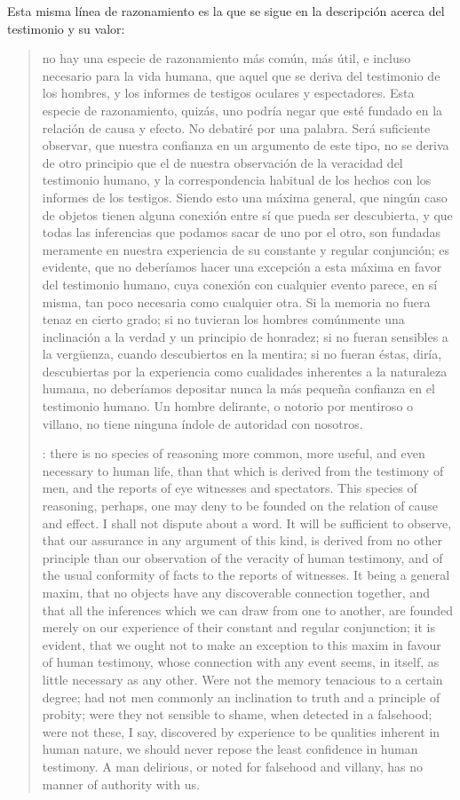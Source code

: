 Esta misma línea de razonamiento es la que se sigue en la descripción acerca del
testimonio y su valor:
\blockquote[{\cite[\S10,1. 74]{hume1777enquiry}}: there is no species of
reasoning more common, more useful, and even necessary to human life, than that
which is derived from the testimony of men, and the reports of eye witnesses and
spectators. This species of reasoning, perhaps, one may deny to be founded on
the relation of cause and effect. I shall not dispute about a word. It will be
sufficient to observe, that our assurance in any argument of this kind, is
derived from no other principle than our observation of the veracity of human
testimony, and of the usual conformity of facts to the reports of witnesses. It
being a general maxim, that no objects have any discoverable connection
together, and that all the inferences which we can draw from one to another, are
founded merely on our experience of their constant and regular conjunction; it
is evident, that we ought not to make an exception to this maxim in favour of
human testimony, whose connection with any event seems, in itself, as little
necessary as any other. Were not the memory tenacious to a certain degree; had
not men commonly an inclination to truth and a principle of probity; were they
not sensible to shame, when detected in a falsehood; were not these, I say,
discovered by experience to be qualities inherent in human nature, we should
never repose the least confidence in human testimony. A man delirious, or noted
for falsehood and villany, has no manner of authority with us.]{no hay una
  especie de razonamiento más común, más útil, e incluso necesario para la vida
  humana, que aquel que se deriva del testimonio de los hombres, y los informes
  de testigos oculares y espectadores. Esta especie de razonamiento, quizás, uno
  podría negar que esté fundado en la relación de causa y efecto. No debatiré
  por una palabra. Será suficiente observar, que nuestra confianza en un
  argumento de este tipo, no se deriva de otro principio que el de nuestra
  observación de la veracidad del testimonio humano, y la correspondencia
  habitual de los hechos con los informes de los testigos. Siendo esto una
  máxima general, que ningún caso de objetos tienen alguna conexión entre sí que
  pueda ser descubierta, y que todas las inferencias que podamos sacar de uno
  por el otro, son fundadas meramente en nuestra experiencia de su constante y
  regular conjunción; es evidente, que no deberíamos hacer una excepción a esta
  máxima en favor del testimonio humano, cuya conexión con cualquier evento
  parece, en sí misma, tan poco necesaria como cualquier otra. Si la memoria no
  fuera tenaz en cierto grado; si no tuvieran los hombres comúnmente una
  inclinación a la verdad y un principio de honradez; si no fueran sensibles a
  la vergüenza, cuando descubiertos en la mentira; si no fueran éstas, diría,
  descubiertas por la experiencia como cualidades inherentes a la naturaleza
  humana, no deberíamos depositar nunca la más pequeña confianza en el
  testimonio humano. Un hombre delirante, o notorio por mentiroso o villano, no
  tiene ninguna índole de autoridad con nosotros.}

